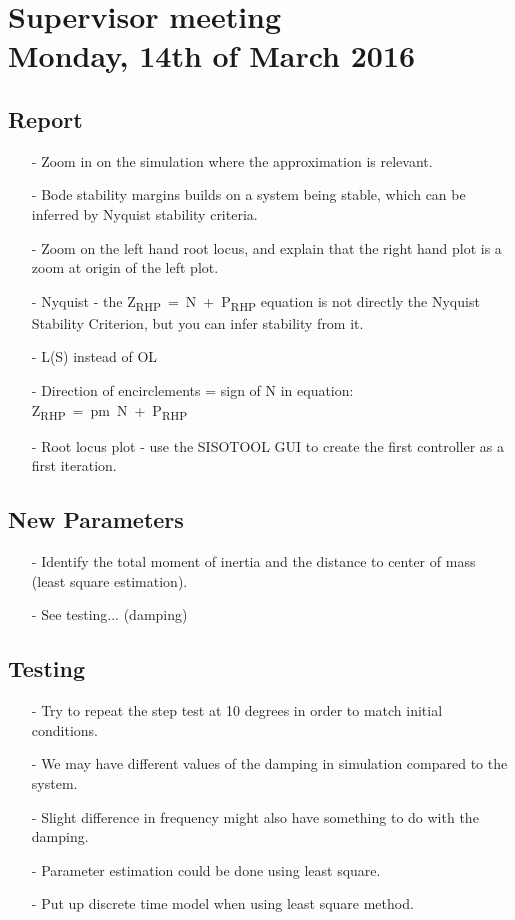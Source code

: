 

\renewcommand\chaptername{KAPITEL}
\renewcommand\contentsname{Indhold}
\renewcommand\figurename{Figur}
\renewcommand\tablename{Tabel}

\section*{Supervisor meeting\\ \small Monday, 14th of March 2016}

\subsection{Report}
\begin{itemize}
  \item[-] Zoom in on the simulation where the approximation is relevant.
  \item[-] Bode stability margins builds on a system being stable, which can be inferred by Nyquist stability criteria.
  \item[-] Zoom on the left hand root locus, and explain that the right hand plot is a zoom at origin of the left plot.
  \item[-] Nyquist - the \si{Z_{RHP} = N + P_{RHP}} equation is not directly the Nyquist Stability Criterion, but you can infer stability from it.
  \item[-] L(S) instead of OL
  \item[-] Direction of encirclements = sign of \si{N} in equation: \si{Z_{RHP} = \pm N + P_{RHP}}
  \item[-] Root locus plot - use the SISOTOOL GUI to create the first controller as a first iteration.
\end{itemize}

\subsection{New Parameters}
\begin{itemize}
  \item[-] Identify the total moment of inertia and the distance to center of mass (least square estimation).
  \item[-] See testing... (damping)
\end{itemize}

\subsection{Testing}
\begin{itemize}
\item[-] Try to repeat the step test at 10 degrees in order to match initial conditions.
\item[-] We may have different values of the damping in simulation compared to the system.
\item[-] Slight difference in frequency might also have something to do with the damping.
\item[-] Parameter estimation could be done using least square.
\item[-] Put up discrete time model when using least square method.
\end{itemize}

